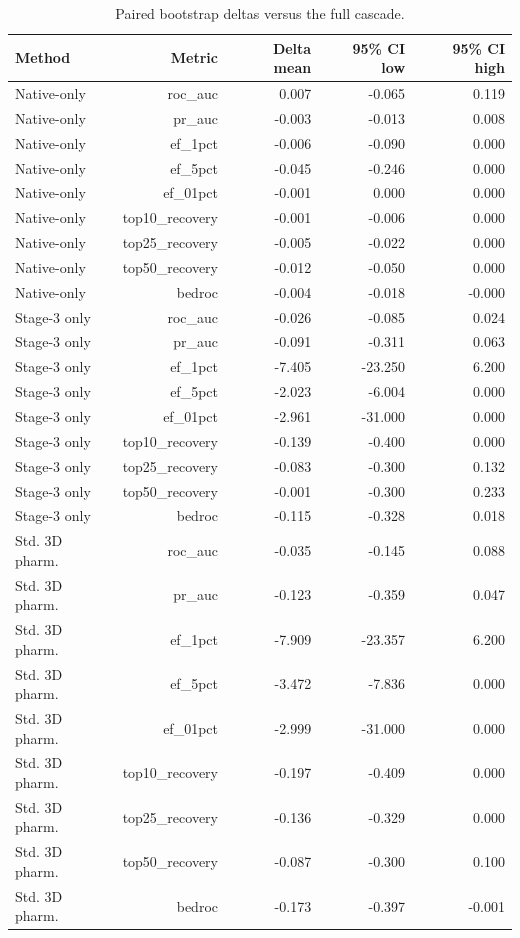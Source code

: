 \begin{table}[htbp]
\centering
\small
\caption{Paired bootstrap deltas versus the full cascade.}
\label{tab:benchmark_deltas}
\begin{tabular}{lrrrr}
\toprule
Method & Metric & Delta mean & 95\% CI low & 95\% CI high \\
\midrule
Native-only & roc\_auc & 0.007 & -0.065 & 0.119 \\
Native-only & pr\_auc & -0.003 & -0.013 & 0.008 \\
Native-only & ef\_1pct & -0.006 & -0.090 & 0.000 \\
Native-only & ef\_5pct & -0.045 & -0.246 & 0.000 \\
Native-only & ef\_01pct & -0.001 & 0.000 & 0.000 \\
Native-only & top10\_recovery & -0.001 & -0.006 & 0.000 \\
Native-only & top25\_recovery & -0.005 & -0.022 & 0.000 \\
Native-only & top50\_recovery & -0.012 & -0.050 & 0.000 \\
Native-only & bedroc & -0.004 & -0.018 & -0.000 \\
Stage-3 only & roc\_auc & -0.026 & -0.085 & 0.024 \\
Stage-3 only & pr\_auc & -0.091 & -0.311 & 0.063 \\
Stage-3 only & ef\_1pct & -7.405 & -23.250 & 6.200 \\
Stage-3 only & ef\_5pct & -2.023 & -6.004 & 0.000 \\
Stage-3 only & ef\_01pct & -2.961 & -31.000 & 0.000 \\
Stage-3 only & top10\_recovery & -0.139 & -0.400 & 0.000 \\
Stage-3 only & top25\_recovery & -0.083 & -0.300 & 0.132 \\
Stage-3 only & top50\_recovery & -0.001 & -0.300 & 0.233 \\
Stage-3 only & bedroc & -0.115 & -0.328 & 0.018 \\
Std. 3D pharm. & roc\_auc & -0.035 & -0.145 & 0.088 \\
Std. 3D pharm. & pr\_auc & -0.123 & -0.359 & 0.047 \\
Std. 3D pharm. & ef\_1pct & -7.909 & -23.357 & 6.200 \\
Std. 3D pharm. & ef\_5pct & -3.472 & -7.836 & 0.000 \\
Std. 3D pharm. & ef\_01pct & -2.999 & -31.000 & 0.000 \\
Std. 3D pharm. & top10\_recovery & -0.197 & -0.409 & 0.000 \\
Std. 3D pharm. & top25\_recovery & -0.136 & -0.329 & 0.000 \\
Std. 3D pharm. & top50\_recovery & -0.087 & -0.300 & 0.100 \\
Std. 3D pharm. & bedroc & -0.173 & -0.397 & -0.001 \\
\bottomrule
\end{tabular}
\end{table}